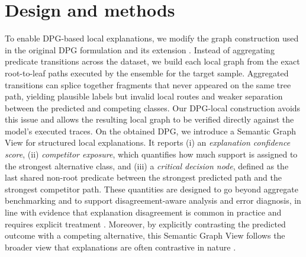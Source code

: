 \documentclass[runningheads]{llncs}
\begin{document}
\section{Design and methods}\label{sec:desMethods}
To enable DPG-based local explanations, we modify the graph construction used in the original DPG formulation and its extension \cite{arrighi2024decision,ceschin2025extending}. 
Instead of aggregating predicate transitions across the dataset, we build each local graph from the exact root-to-leaf paths executed by the ensemble for the target sample. Aggregated transitions can splice together fragments that never appeared on the same tree path, yielding plausible labels but invalid local routes and weaker separation between the predicted and competing classes. Our DPG-local construction avoids this issue and allows the resulting local graph to be verified directly against the model’s executed traces.
On the obtained DPG, we introduce a Semantic Graph View for structured local explanations. It reports (i) an \emph{explanation confidence score}, (ii) \emph{competitor exposure}, which quantifies how much support is assigned to the strongest alternative class, and (iii) a \emph{critical decision node}, defined as the last shared non-root predicate between the strongest predicted path and the strongest competitor path. These quantities are designed to go beyond aggregate benchmarking and to support disagreement-aware analysis and error diagnosis, in line with evidence that explanation disagreement is common in practice and requires explicit treatment \cite{krishna2022disagreement}. 
Moreover, by explicitly contrasting the predicted outcome with a competing alternative, this Semantic Graph View follows the broader view that explanations are often contrastive in nature \cite{miller2019explanation}. 
\end{document}
